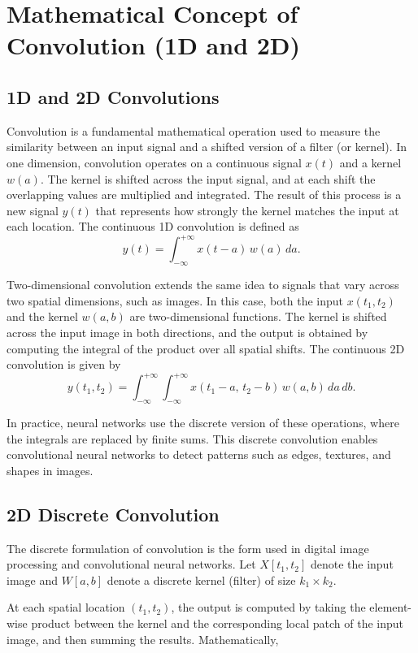 \documentclass{article}
\begin{document}
\section{Mathematical Concept of Convolution (1D and 2D)}

\subsection{1D and 2D Convolutions}

Convolution is a fundamental mathematical operation used to measure the similarity between an input signal and a shifted version of a filter (or kernel). In one dimension, convolution operates on a continuous signal $x(t)$ and a kernel $w(a)$. The kernel is shifted across the input signal, and at each shift the overlapping values are multiplied and integrated. The result of this process is a new signal $y(t)$ that represents how strongly the kernel matches the input at each location. The continuous 1D convolution is defined as
\[
y(t)=\int_{-\infty}^{+\infty} x(t-a)\,w(a)\,da.
\]

Two-dimensional convolution extends the same idea to signals that vary across two spatial dimensions, such as images. In this case, both the input $x(t_1,t_2)$ and the kernel $w(a,b)$ are two-dimensional functions. The kernel is shifted across the input image in both directions, and the output is obtained by computing the integral of the product over all spatial shifts. The continuous 2D convolution is given by
\[
y(t_1,t_2)=\int_{-\infty}^{+\infty}\int_{-\infty}^{+\infty}
x(t_1-a,\,t_2-b)\,w(a,b)\,da\,db.
\]

In practice, neural networks use the discrete version of these operations, where the integrals are replaced by finite sums. This discrete convolution enables convolutional neural networks to detect patterns such as edges, textures, and shapes in images.

\subsection{2D Discrete Convolution}

The discrete formulation of convolution is the form used in digital image processing and convolutional neural networks. Let $X[t_1, t_2]$ denote the input image and $W[a,b]$ denote a discrete kernel (filter) of size $k_1 \times k_2$. 

At each spatial location $(t_1, t_2)$, the output is computed by taking the element-wise product between the kernel and the corresponding local patch of the input image, and then summing the results. Mathematically,
\end{document}
